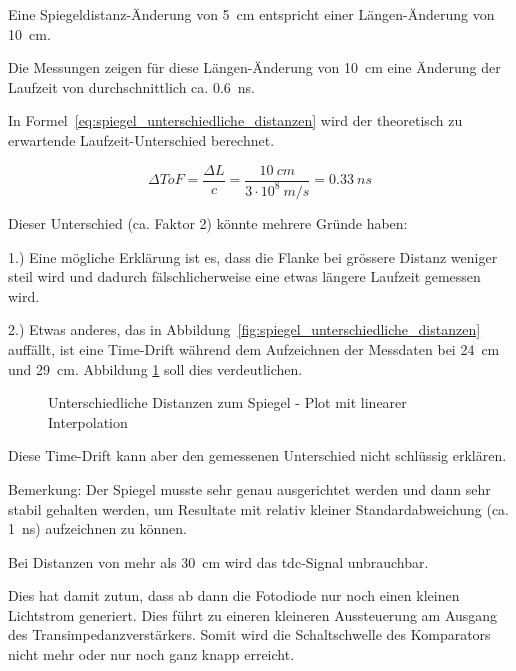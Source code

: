 Eine Spiegeldistanz-Änderung von 5~cm entspricht einer Längen-Änderung von 10~cm.

Die Messungen zeigen für diese Längen-Änderung von 10~cm eine Änderung der Laufzeit von durchschnittlich ca. 0.6~ns.

In Formel~\ref{eq:spiegel_unterschiedliche_distanzen} wird der theoretisch zu erwartende Laufzeit-Unterschied berechnet.

\begin{equation}\label{eq:spiegel_unterschiedliche_distanzen}
    \Delta ToF = \frac{\Delta L}{c} = \frac{10~cm}{3 \cdot 10^8~m/s} = 0.33~ns
\end{equation}


Dieser Unterschied (ca. Faktor 2) könnte mehrere Gründe haben:

1.) Eine mögliche Erklärung ist es, dass die Flanke bei
grössere Distanz weniger steil wird und dadurch fälschlicherweise eine etwas längere Laufzeit gemessen wird.

2.) Etwas anderes, das in Abbildung~\ref{fig:spiegel_unterschiedliche_distanzen} auffällt, ist eine Time-Drift während
dem Aufzeichnen der Messdaten bei 24~cm und 29~cm. Abbildung \ref{fig:spiegel_unterschiedliche_distanzen_linear} soll
dies verdeutlichen.

\begin{figure}[H]
    \centering
    
    \caption{Unterschiedliche Distanzen zum Spiegel - Plot mit linearer Interpolation}\label{fig:spiegel_unterschiedliche_distanzen_linear}
\end{figure}

Diese Time-Drift kann aber den gemessenen Unterschied nicht schlüssig erklären.

Bemerkung: Der Spiegel musste sehr genau ausgerichtet werden und dann sehr stabil gehalten werden, um Resultate mit
relativ kleiner Standardabweichung (ca. 1~ns) aufzeichnen zu können.

Bei Distanzen von mehr als 30~cm wird das \acrshort{tdc}-Signal unbrauchbar.

Dies hat damit zutun, dass ab dann die Fotodiode nur noch einen kleinen Lichtstrom generiert. Dies führt zu eineren
kleineren Aussteuerung am Ausgang des Transimpedanzverstärkers. Somit wird die Schaltschwelle des Komparators nicht mehr
oder nur noch ganz knapp erreicht.


